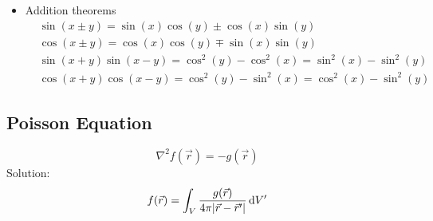 \documentclass[a4paper, fontsize=8pt, landscape, DIV=1]{scrartcl}
\begin{document}
\begin{multicols*}{4}
\begin{itemize}
    \item Addition theorems
    {\small\begin{align*}
      & \sin(x\pm y) = \sin(x)\cos(y) \pm \cos(x)\sin(y) \\
      & \cos(x\pm y) = \cos(x)\cos(y) \mp \sin(x)\sin(y) \\
      & \sin(x+y)\sin(x-y) = \cos^2(y)-\cos^2(x) = \sin^2(x) - \sin^2(y)\\
      & \cos(x+y)\cos(x-y) = \cos^2(y)-\sin^2(x) = \cos^2(x) - \sin^2(y)
    \end{align*}}%
  \end{itemize}

  \subsection{Poisson Equation}
    \[\nabla^2f(\vec{r}) = -g(\vec{r})\]
    Solution:
    \[f(\vec{r}) = \int_V \frac{g(\vec{r})}{4\pi|\vec{r}-\vec{r}'|} \,\mathrm{d} V'\]

  
  \vfill\null
  \columnbreak
  \end{multicols*}
\end{document}
